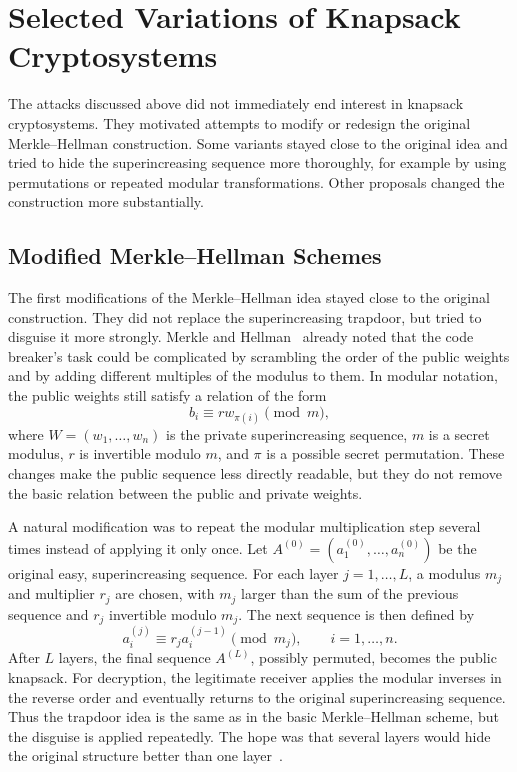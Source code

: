 \section{Selected Variations of Knapsack Cryptosystems}

The attacks discussed above did not immediately end interest in knapsack
cryptosystems. They motivated attempts to modify or redesign the original
Merkle--Hellman construction. Some variants stayed close to the original idea
and tried to hide the superincreasing sequence more thoroughly, for example by
using permutations or repeated modular transformations. Other proposals changed
the construction more substantially.

\subsection{Modified Merkle--Hellman Schemes}

The first modifications of the Merkle--Hellman idea stayed close to the
original construction. They did not replace the superincreasing trapdoor, but
tried to disguise it more strongly. Merkle and
Hellman~\cite[p.~526]{MerkleHellman1978} already noted that the code breaker's
task could be complicated by scrambling the order of the public weights and by
adding different multiples of the modulus to them. In modular notation, the
public weights still satisfy a relation of the form
\[
    b_i \equiv r w_{\pi(i)}
    \pmod{m}, 
\]
where $W=(w_1,\dots,w_n)$ is the private superincreasing sequence, $m$ is a
secret modulus, $r$ is invertible modulo $m$, and $\pi$ is a possible secret
permutation. These changes make the public sequence less directly readable, but
they do not remove the basic relation between the public and private weights.

A natural modification was to repeat the modular multiplication step several
times instead of applying it only once. Let \(A^{(0)}=(a_1^{(0)},\dots,a_n^{(0)})\)
be the original easy, superincreasing sequence. For each layer
\(j=1,\dots,L\), a modulus \(m_j\) and multiplier \(r_j\) are chosen, with
\(m_j\) larger than the sum of the previous sequence and \(r_j\) invertible
modulo \(m_j\). The next sequence is then defined by
\[
    a_i^{(j)} \equiv r_j a_i^{(j-1)} \pmod{m_j},
    \qquad i=1,\dots,n.
\]
After \(L\) layers, the final sequence \(A^{(L)}\), possibly permuted, becomes
the public knapsack. For decryption, the legitimate receiver applies the
modular inverses in the reverse order and eventually returns to the original
superincreasing sequence. Thus the trapdoor idea is the same as in the basic
Merkle--Hellman scheme, but the disguise is applied repeatedly. The hope was
that several layers would hide the original structure better than one
layer~\cite{Brickell1984,OdlyzkoRiseFall}.

